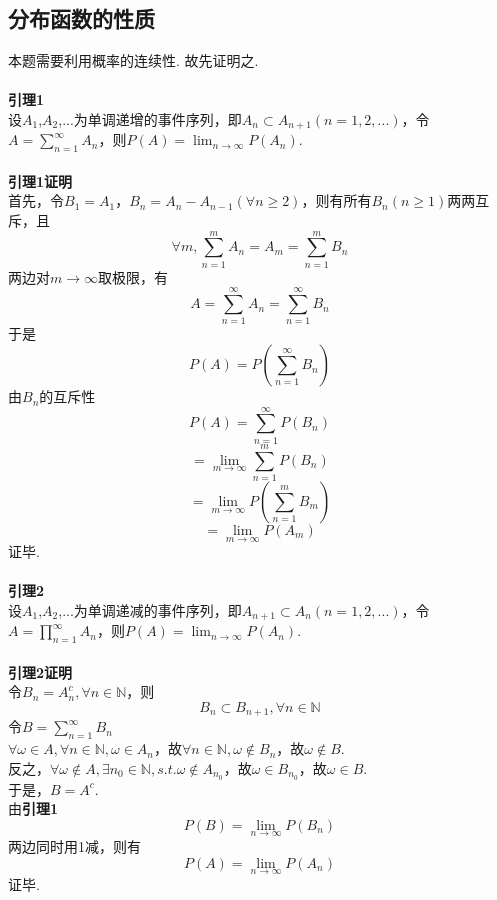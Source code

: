 \documentclass{article}
\begin{document}
\begin{CJK}{UTF8}{gbsn}
\section{分布函数的性质}
本题需要利用概率的连续性. 故先证明之.
\\\\
\textbf{引理1}\\
设$A_{1}$,$A_{2}$,...为单调递增的事件序列，即$A_{n}\subset A_{n+1}(n=1,2,...)$，令$A=\sum\limits_{n=1}^{\infty}A_{n}$，则$P(A)=\lim_{n\to \infty}P(A_{n})$.
\\\\
\textbf{引理1证明}\\
首先，令$B_{1}=A_{1}$，$B_{n}=A_{n}-A_{n-1}(\forall n\geq 2)$，则有所有$B_{n}(n\geq 1)$两两互斥，且
$$ \forall m,\sum\limits_{n=1}^{m}A_{n}=A_{m}=\sum\limits_{n=1}^{m}B_{n} $$
两边对$m\to \infty$取极限，有
$$ A=\sum\limits_{n=1}^{\infty}A_{n}=\sum\limits_{n=1}^{\infty}B_{n} $$
于是
$$ P(A)=P(\sum\limits_{n=1}^{\infty}B_{n}) $$
由$B_{n}$的互斥性
$$ P(A)=\sum\limits_{n=1}^{\infty}P(B_{n}) $$
$$ =\lim_{m\to \infty}\sum\limits_{n=1}^{m}P(B_{n}) $$
$$ =\lim_{m\to \infty}P(\sum\limits_{n=1}^{m}B_{m}) $$
$$ =\lim_{m\to \infty}P(A_{m}) $$
证毕.
\\\\
\textbf{引理2}\\
设$A_{1}$,$A_{2}$,...为单调递减的事件序列，即$A_{n+1}\subset A_{n}(n=1,2,...)$，令$A=\prod\limits_{n=1}^{\infty}A_{n}$，则$P(A)=\lim_{n\to \infty}P(A_{n})$.
\\\\
\textbf{引理2证明}\\
令$B_{n}=A_{n}^{c},\forall n\in\mathbb{N}$，则\\
$$ B_{n}\subset B_{n+1},\forall n\in\mathbb{N}$$
令$B=\sum\limits_{n=1}^{\infty}B_{n}$\\
$\forall \omega\in A,\forall n\in\mathbb{N},\omega\in A_{n}$，故$\forall n\in\mathbb{N},\omega\notin B_{n}$，故$\omega\notin B$.\\
反之，$\forall \omega\notin A,\exists n_{0}\in\mathbb{N},s.t.\omega\notin A_{n_{0}}$，故$\omega\in B_{n_{0}}$，故$\omega\in B$.\\
于是，$B=A^{c}$.\\
由\textbf{引理1}
$$ P(B)=\lim_{n\to \infty}P(B_{n}) $$
两边同时用1减，则有
$$ P(A)=\lim_{n\to\infty}P(A_{n})$$
证毕.

\end{CJK}
\end{document}
